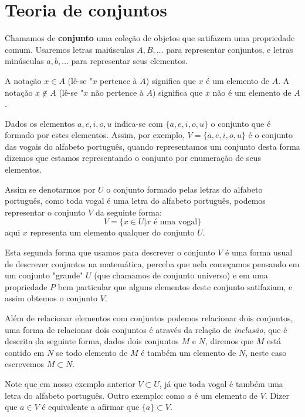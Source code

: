 \chapter{Teoria de conjuntos}


Chamamos de \textbf{conjunto} uma coleção de objetos que satifazem uma propriedade comum. Usaremos letras maiúsculas $A, B, \ldots$ para representar  conjuntos, e letras minúsculas $a, b, \ldots$ para representar seus elementos.

A notação $x \in A$ (lê-se "$x$ pertence à $A$) significa que $x$ é um elemento de $A$. A notação $x \notin A$ (lê-se "$x$ não pertence à $A$) significa que $x$ não é um elemento de $A$.

Dados os elementos $a, e, i, o, u$ indica-se com $\{a, e, i, o, u\}$ o conjunto que é formado por estes elementos. Assim, por exemplo, $V= \{a, e, i, o, u\}$ é o conjunto das vogais do alfabeto português, quando representamos um conjunto desta forma dizemos que estamos representando o conjunto por enumeração de seus elementos.

Assim se denotarmos por $U$ o conjunto formado pelas letras do alfabeto português, como toda vogal é uma letra do alfabeto português, podemos representar o conjunto $V$ da seguinte forma:
\[V= \{x \in U | x \text{ é uma vogal}\}\]
aqui $x$ representa um elemento qualquer do conjunto $U$.

Esta segunda forma que usamos para descrever o conjunto $V$ é uma forma usual de descrever conjuntos na matemática, perceba que nela começamos pensando em um conjunto "grande" $U$ (que chamamos de conjunto universo) e em uma propriedade $P$ bem particular que alguns elementos deste conjunto satifaziam, e assim obtemos o conjunto $V$.

Além de relacionar elementos com conjuntos podemos relacionar dois conjuntos, uma forma de relacionar dois conjuntos é através da relação de \textit{inclusão}, que é descrita da seguinte forma, dados dois conjuntos $M$ e $N$, diremos que $M$ está contido em $N$ se todo elemento de $M$ é também um elemento de $N$, neste caso escrevemos $M \subset N$. 

Note que em nosso exemplo anterior $V \subset U$, já que toda vogal é também uma letra do alfabeto português. Outro exemplo: como $a$ é um elemento de $V$. Dizer que $a \in V$ é equivalente a afirmar que $\{a\} \subset V$.

\vskip0.4cm

